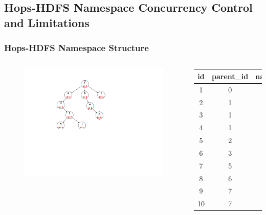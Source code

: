 \documentclass{beamer}
\begin{document}
\subsection{Hops-HDFS Namespace Concurrency Control and Limitations}
\begin{frame}
	\frametitle{Hops-HDFS Namespace Structure}
	\begin{columns}[c] %
	
		\begin{figure}[h]
			\centering
			\includegraphics[scale=0.6]{figs/hoptree.pdf}
		\end{figure}
	
	\begin{table}[h]
		\centering
		\begin{tabular}{|c|c|c|}
			\hline
			\textbf{id} & \textbf{parent\_id} & \textbf{name}\\ \hline
			1 & 0 & / \\ \hline
			2 & 1 & a \\ \hline
			3 & 1 & b \\ \hline
			4 & 1 & c \\ \hline
			5 & 2 & d \\ \hline
			6 & 3 & e \\ \hline
			7 & 5 & f \\ \hline
			8 & 6 & g \\ \hline
			9 & 7 & h \\ \hline
			10 & 7 & i \\ \hline
		\end{tabular}
	\end{table}
	
	\end{columns}
\end{frame}
\end{document}
